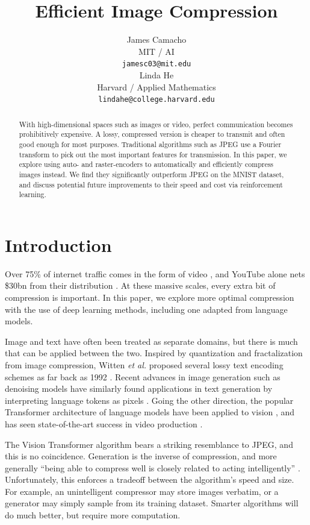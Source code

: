 \documentclass[11pt]{article}
\title{Efficient Image Compression}
\author{James Camacho \\
  MIT / AI \\
  \texttt{jamesc03@mit.edu} \\\And
  Linda He \\
  Harvard / Applied Mathematics \\
  \texttt{lindahe@college.harvard.edu} \\}
\begin{document}
\maketitle
\begin{abstract}
  With high-dimensional spaces such as images or video, perfect communication becomes prohibitively expensive. A lossy, compressed version is cheaper to transmit and often good enough for most purposes. Traditional algorithms such as JPEG use a Fourier transform to pick out the most important features for transmission. In this paper, we explore using auto- and raster-encoders to automatically and efficiently compress images instead. We find they significantly outperform JPEG on the MNIST dataset, and discuss potential future improvements to their speed and cost via reinforcement learning.
\end{abstract}


\section{Introduction}


Over 75\% of internet traffic comes in the form of video \citep{cisco-2018-traffic}, and YouTube alone nets \$30bn from their distribution \citep{alphabet-2024-earnings}. At these massive scales, every extra bit of compression is important. In this paper, we explore more optimal compression with the use of deep learning methods, including one adapted from language models.

Image and text have often been treated as separate domains, but there is much that can be applied between the two. Inspired by quantization and fractalization from image compression, Witten \textit{et al.} proposed several lossy text encoding schemes as far back as 1992 \citep{witten-etal-1992-lossy}. Recent advances in image generation such as denoising models \citep{ho-2020-denoising} have similarly found applications in text generation by interpreting language tokens as pixels \citep{kou-2024-cllms}. Going the other direction, the popular Transformer architecture of language models have been applied to vision \citep{dosovitskiy-2021-vit}, and has seen state-of-the-art success in video production \citep{liu-2024-sora}.

The Vision Transformer algorithm bears a striking resemblance to JPEG, and this is no coincidence. Generation is the inverse of compression, and more generally ``being able to compress well is closely related to acting intelligently'' \citep{hutter-2020}. Unfortunately, this enforces a tradeoff between the algorithm's speed and size. For example, an unintelligent compressor may store images verbatim, or a generator may simply sample from its training dataset. Smarter algorithms will do much better, but require more computation.
\end{document}
